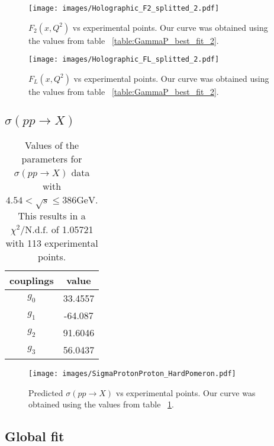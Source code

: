 \documentclass[preprint, 12pt]{elsarticle}
\begin{document}
\begin{figure}[!h]
\center
\texttt{[image: images/Holographic\_F2\_splitted\_2.pdf]} 
\caption{$F_2\left(x,Q^2\right)$ vs experimental points. Our curve was obtained using the values from table ~\ref{table:GammaP_best_fit_2}.}
\label{fig:F2_best_fit_2}
\end{figure}

\begin{figure}[!h]
\center
\texttt{[image: images/Holographic\_FL\_splitted\_2.pdf]} 
\caption{$F_L\left(x,Q^2\right)$ vs experimental points. Our curve was obtained using the values from table ~\ref{table:GammaP_best_fit_2}.}
\label{fig:FL_best_fit_2}
\end{figure}

\subsection{$\sigma\left( p p \rightarrow X\right)$}

\begin{table}[b!]
\centering
\caption{Values of the parameters for $\sigma\left(p p \rightarrow X\right)$ data with $4.54 < \sqrt{s} \leq 386 \text{GeV}$. This results in a $\chi^2 / \text{N.d.f.}$ of 1.05721 with 113 experimental points.}
\vspace{0.5cm}
\begin{tabular}{|c|c|}
\hline
couplings   & value \\
\hline
$g_0$  & 33.4557\\ 
\hline
$g_1$  & -64.087 \\ 
\hline
$g_2$  & 91.6046  \\
\hline
$g_3$  & 56.0437\\ 
\hline
\end{tabular}
\label{table:SigmaPP_best_fit}
\end{table}

\begin{figure}[!h]
\center
\texttt{[image: images/SigmaProtonProton\_HardPomeron.pdf]} 
\caption{Predicted $\sigma\left(p p \rightarrow X\right)$ vs experimental points. Our curve was obtained using the values from table ~\ref{table:SigmaPP_best_fit}.}
\label{fig:SigmaPP_best_fit}
\end{figure}

\subsection{Global fit}





\end{document}
